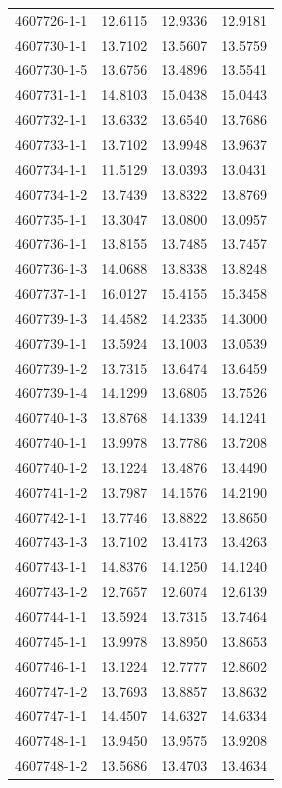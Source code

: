 \begin{longtable}{lrrr}
4607726-1-1 & 12.6115 & 12.9336 & 12.9181 \\
4607730-1-1 & 13.7102 & 13.5607 & 13.5759 \\
4607730-1-5 & 13.6756 & 13.4896 & 13.5541 \\
4607731-1-1 & 14.8103 & 15.0438 & 15.0443 \\
4607732-1-1 & 13.6332 & 13.6540 & 13.7686 \\
4607733-1-1 & 13.7102 & 13.9948 & 13.9637 \\
4607734-1-1 & 11.5129 & 13.0393 & 13.0431 \\
4607734-1-2 & 13.7439 & 13.8322 & 13.8769 \\
4607735-1-1 & 13.3047 & 13.0800 & 13.0957 \\
4607736-1-1 & 13.8155 & 13.7485 & 13.7457 \\
4607736-1-3 & 14.0688 & 13.8338 & 13.8248 \\
4607737-1-1 & 16.0127 & 15.4155 & 15.3458 \\
4607739-1-3 & 14.4582 & 14.2335 & 14.3000 \\
4607739-1-1 & 13.5924 & 13.1003 & 13.0539 \\
4607739-1-2 & 13.7315 & 13.6474 & 13.6459 \\
4607739-1-4 & 14.1299 & 13.6805 & 13.7526 \\
4607740-1-3 & 13.8768 & 14.1339 & 14.1241 \\
4607740-1-1 & 13.9978 & 13.7786 & 13.7208 \\
4607740-1-2 & 13.1224 & 13.4876 & 13.4490 \\
4607741-1-2 & 13.7987 & 14.1576 & 14.2190 \\
4607742-1-1 & 13.7746 & 13.8822 & 13.8650 \\
4607743-1-3 & 13.7102 & 13.4173 & 13.4263 \\
4607743-1-1 & 14.8376 & 14.1250 & 14.1240 \\
4607743-1-2 & 12.7657 & 12.6074 & 12.6139 \\
4607744-1-1 & 13.5924 & 13.7315 & 13.7464 \\
4607745-1-1 & 13.9978 & 13.8950 & 13.8653 \\
4607746-1-1 & 13.1224 & 12.7777 & 12.8602 \\
4607747-1-2 & 13.7693 & 13.8857 & 13.8632 \\
4607747-1-1 & 14.4507 & 14.6327 & 14.6334 \\
4607748-1-1 & 13.9450 & 13.9575 & 13.9208 \\
4607748-1-2 & 13.5686 & 13.4703 & 13.4634 \\

\end{longtable}
